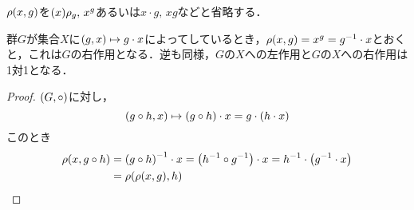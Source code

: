 \documentclass[main]{subfiles}
\begin{document}
		\begin{remark*}
			$\rho\qty(x,g)$を$\qty(x)\rho_g,\,x^g$あるいは$x\cdot g,\,xg$などと省略する．
		\end{remark*}
		\begin{prop}
			群$G$が集合$X$に$\qty(g,x)\mapsto g\cdot x$によってしているとき，$\rho\qty(x,g)=x^g=g^{-1}\cdot x$とおくと，これは$G$の右作用となる．逆も同様，$G$の$X$への左作用と$G$の$X$への右作用は1対1となる．
		\end{prop}
		\begin{proof}
			$\qty(G,\circ)$に対し，
			\[\qty(g\circ h,x)\mapsto\qty(g\circ h)\cdot x=g\cdot\qty(h\cdot x)\]
			このとき
			\begin{align*}
				\rho\qty(x,g\circ h) & =\qty(g\circ h)^{-1}\cdot x=\qty(h^{-1}\circ g^{-1})\cdot x=h^{-1}\cdot\qty(g^{-1}\cdot x) \\
				                     & =\rho\qty(\rho\qty(x,g),h)
			\end{align*}
		\end{proof}
\end{document}
